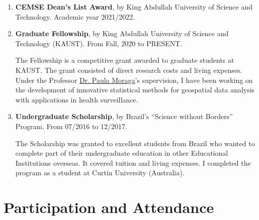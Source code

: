 \documentclass[10pt, ]{article}
\begin{document}
	\begin{enumerate}[noitemsep, topsep=0pt]
		\item \textbf{CEMSE Dean's List Award}, by King Abdullah University of Science and Technology. Academic year 2021/2022.
		
		\item \textbf{Graduate Fellowship}, by King Abdullah University of Science and Technology (KAUST). From Fall, 2020 to PRESENT.
		
		The Fellowship is a competitive grant awarded to graduate students at KAUST. The grant consisted of direct research costs and living expenses. Under the Professor \href{https://www.paulamoraga.com/}{Dr. Paula Moraga}'s supervision, I have been working on the development of innovative statistical methods for geospatial data analysis with applications in health surveillance.
		
		\item \textbf{Undergraduate Scholarship}, by Brazil's ``Science without Borders'' Program. From 07/2016 to 12/2017.
		
		The Scholarship was granted to excellent students from Brazil who wanted to complete part of their undergraduate education in other Educational Institutions overseas. It covered tuition and living expenses. I completed the program as a student at Curtin University (Australia).
		
	\end{enumerate}
	
	\noindent\makebox[\linewidth]{\rule{\paperwidth}{0.5pt}}
	
	\vspace{-12pt}
	\section*{Participation and Attendance} \vspace{-5pt}
	
\end{document}
